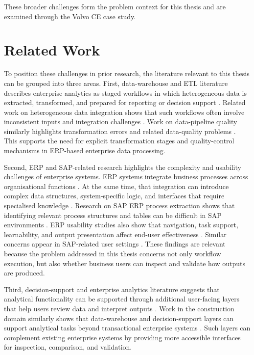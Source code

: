 These broader challenges form the problem context for this thesis and are examined through the Volvo CE case study.








\section{Related Work}

To position these challenges in prior research, the literature relevant to this thesis can be grouped into three areas. First, data-warehouse and ETL literature describes enterprise analytics as staged workflows in which heterogeneous data is extracted, transformed, and prepared for reporting or decision support \cite{vassiliadis2009etl}. Related work on heterogeneous data integration shows that such workflows often involve inconsistent inputs and integration challenges \cite{putrama2024heterogeneous}. Work on data-pipeline quality similarly highlights transformation errors and related data-quality problems \cite{foidl2024pipeline}. This supports the need for explicit transformation stages and quality-control mechanisms in ERP-based enterprise data processing.

Second, ERP and SAP-related research highlights the complexity and usability challenges of enterprise systems. ERP systems integrate business processes across organisational functions \cite{klaus2000}. At the same time, that integration can introduce complex data structures, system-specific logic, and interfaces that require specialised knowledge \cite{davenport1998}. Research on SAP ERP process extraction shows that identifying relevant process structures and tables can be difficult in SAP environments \cite{weber2022sap}. ERP usability studies also show that navigation, task support, learnability, and output presentation affect end-user effectiveness \cite{calisir2004erp}. Similar concerns appear in SAP-related user settings \cite{wong2016sap}. These findings are relevant because the problem addressed in this thesis concerns not only workflow execution, but also whether business users can inspect and validate how outputs are produced.

Third, decision-support and enterprise analytics literature suggests that analytical functionality can be supported through additional user-facing layers that help users review data and interpret outputs \cite{march2007dss}. Work in the construction domain similarly shows that data-warehouse and decision-support layers can support analytical tasks beyond transactional enterprise systems \cite{fan2006equipmentdw}. Such layers can complement existing enterprise systems by providing more accessible interfaces for inspection, comparison, and validation.

